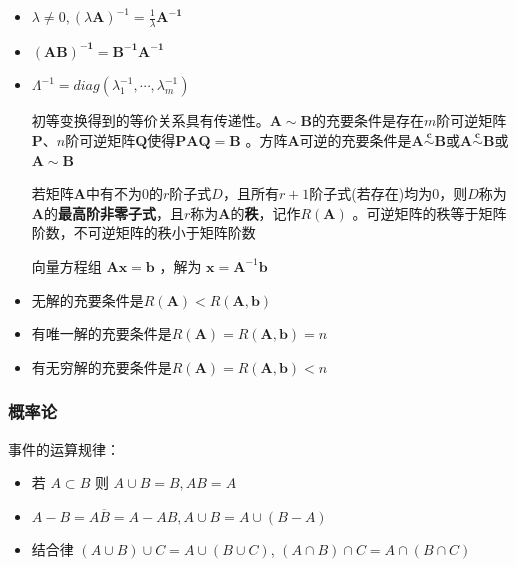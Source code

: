 \documentclass[twocolumn,10pt]{ctexart}
\begin{document}
\begin{itemize}
\item $\lambda\neq0,\allowbreak{}(\lambda\mathbf{A})^{-1}=\frac1\lambda\mathbf{A^{-1}}$
\item $\mathbf{(AB)^{-1}=B^{-1}A^{-1}}$
\item $\Lambda^{-1}=diag(\lambda_1^{-1},\allowbreak{}\cdots,\allowbreak{}\lambda_m^{-1})$

初等变换得到的等价关系具有传递性。$\mathbf{A\sim B}$的充要条件是存在$m$阶可逆矩阵$\mathbf{P}$、$n$阶可逆矩阵$\mathbf{Q}$使得$\mathbf{PAQ=B}$ 。方阵$\mathbf A$可逆的充要条件是$\mathbf{A\overset{c}{\sim}B}$或$\mathbf{A\overset{c}{\sim}B}$或$\mathbf{A\sim B}$

若矩阵$\mathbf A$中有不为$0$的$r$阶子式$D$，且所有$r+1$阶子式(若存在)均为$0$，则$D$称为$\mathbf A$的\textbf{最高阶非零子式}，且$r$称为$\mathbf A$的\textbf{秩}，记作$R(\mathbf A)$ 。可逆矩阵的秩等于矩阵阶数，不可逆矩阵的秩小于矩阵阶数

向量方程组 $\mathbf A\mathbf x=\mathbf b$ ，解为 $\mathbf x=\mathbf A^{-1}\mathbf b$
\end{itemize}

\begin{itemize}
\item 无解的充要条件是$R(\mathbf A)<R(\mathbf A,\allowbreak{}\mathbf b)$
\item 有唯一解的充要条件是$R(\mathbf A)=R(\mathbf A,\allowbreak{}\mathbf b)=n$
\item 有无穷解的充要条件是$R(\mathbf A)=R(\mathbf A,\allowbreak{}\mathbf b)<n$
\end{itemize}

\subsubsection{概率论}

事件的运算规律：

\begin{itemize}
\item 若 $A\subset B$ 则 $A\cup B=B,AB=A$
\end{itemize}

\begin{itemize}
\item $A-B=A\overline B=A-AB,\allowbreak{}A\cup B=A\cup(B-A)$
\end{itemize}

\begin{itemize}
\item 结合律 $(A\cup B)\cup C=A\cup(B\cup C)$, $(A\cap B)\cap C=A\cap(B\cap C)$
\end{itemize}
\end{document}
